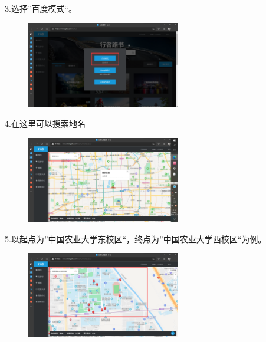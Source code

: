 \documentclass{ctexbook}
\begin{document}
3.选择''百度模式``。
       \begin{figure}[H]
            \begin{center}
            \includegraphics[width=0.6\textwidth]{fig/行者3}
            \end{center}
        \end{figure}

4.在这里可以搜索地名
       \begin{figure}[H]
            \begin{center}
            \includegraphics[width=0.6\textwidth]{fig/行者4}
            \end{center}
        \end{figure}

5.以起点为''中国农业大学东校区``，终点为''中国农业大学西校区``为例。
       \begin{figure}[H]
            \begin{center}
            \includegraphics[width=0.6\textwidth]{fig/行者5}
            \end{center}
        \end{figure}
\end{document}
